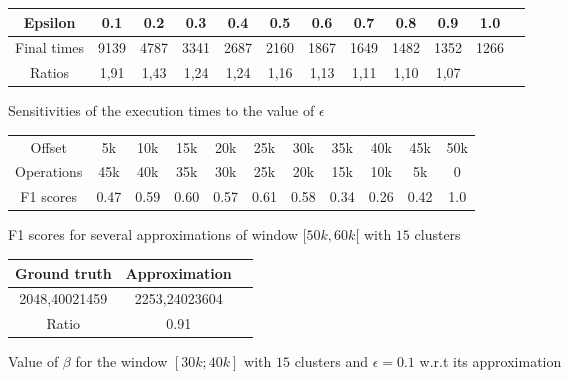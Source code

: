 \documentclass[a4paper,10pt]{article}
\begin{document}
\begin{appendices}
\begin{figure}
	\centering
	\begin{tabular}{|c|c|c|c|c|c|c|c|c|c|c|c|}
		\hline
		Epsilon & 0.1 & 0.2&0.3&0.4&0.5&0.6&0.7&0.8&0.9&1.0\\ \hline
		Final times & 9139 &	4787 &	3341 &	2687 &	2160 &	1867 &	1649 &	1482 &	1352 &	1266\\
		Ratios &1,91&	1,43&	1,24&	1,24&	1,16&	1,13&	1,11&	1,10&	1,07& \\ \hline	
	\end{tabular}
	\caption{Sensitivities of the execution times to the value of $\epsilon$}
\end{figure}
\begin{figure}
	\centering
	\begin{tabular}{|c|c c c c c c c c c c|}
		\hline
		Offset & 5k & 10k & 15k & 20k & 25k & 30k & 35k & 40k & 45k & 50k\\
		Operations & 45k & 40k & 35k & 30k & 25k & 20k & 15k & 10k & 5k & 0\\ \hline
		F1 scores & 0.47 & 0.59 & 0.60 & 0.57& 0.61 & 0.58 & 0.34 & 0.26 & 0.42 & 1.0 \\ \hline
	\end{tabular}
	\caption{F1 scores for several approximations of window $[50k, 60k[$ with $15$ clusters}
	\label{f1}
\end{figure}
\begin{figure}
	\centering
	\begin{tabular}{|c|c| c |}
		\hline
		Ground truth & Approximation \\ \hline
		2048,40021459 & 2253,24023604 \\ \hline
		Ratio &  0.91 \\ \hline
	\end{tabular}
	\caption{Value of $\beta$ for the window $[30k; 40k]$ with $15$ clusters and $\epsilon = 0.1$ w.r.t its approximation}
	\label{beta_ratio}
\end{figure}
\end{appendices}
\medskip




\end{document}
